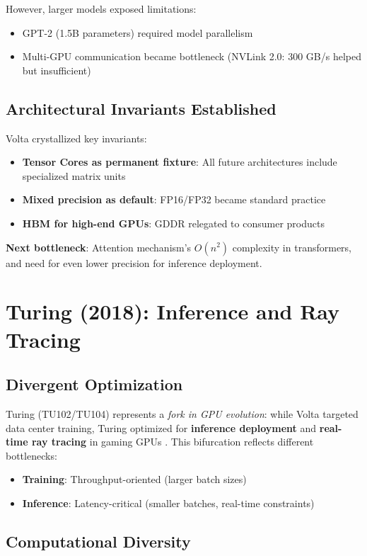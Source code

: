 \documentclass{article}
\begin{document}
However, larger models exposed limitations:
\begin{itemize}
\item GPT-2 (1.5B parameters) required model parallelism
\item Multi-GPU communication became bottleneck (NVLink 2.0: 300 GB/s helped but insufficient)
\end{itemize}

\subsection{Architectural Invariants Established}

Volta crystallized key invariants:
\begin{itemize}
\item \textbf{Tensor Cores as permanent fixture}: All future architectures include specialized matrix units
\item \textbf{Mixed precision as default}: FP16/FP32 became standard practice
\item \textbf{HBM for high-end GPUs}: GDDR relegated to consumer products
\end{itemize}

\textbf{Next bottleneck}: Attention mechanism's $O(n^2)$ complexity in transformers, and need for even lower precision for inference deployment.

\section{Turing (2018): Inference and Ray Tracing}

\subsection{Divergent Optimization}

Turing (TU102/TU104) represents a \textit{fork in GPU evolution}: while Volta targeted data center training, Turing optimized for \textbf{inference deployment} and \textbf{real-time ray tracing} in gaming GPUs \cite{nvidia2018turing}. This bifurcation reflects different bottlenecks:
\begin{itemize}
\item \textbf{Training}: Throughput-oriented (larger batch sizes)
\item \textbf{Inference}: Latency-critical (smaller batches, real-time constraints)
\end{itemize}

\subsection{Computational Diversity}
\end{document}

